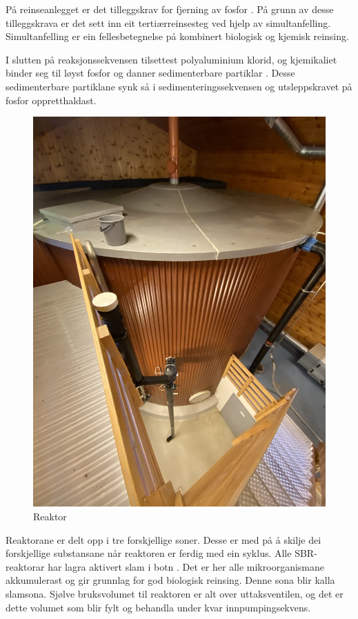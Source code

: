 På reinseanlegget er det tilleggskrav for fjerning av fosfor \citep{Regjeriga}. På grunn av desse tilleggskrava
er det sett inn eit tertiærreinsesteg ved hjelp av simultanfelling.
Simultanfelling er ein fellesbetegnelse på kombinert biologisk og kjemisk reinsing.

I slutten på reaksjonssekvensen tilsettest polyaluminium klorid, og kjemikaliet binder seg til
løyst fosfor og danner sedimenterbare partiklar \citep{Pax18}. Desse sedimenterbare partiklane synk 
så i sedimenteringssekvensen og utsleppskravet på fosfor oppretthaldast.

\begin{figure}[htbp]
    \centering
    \includegraphics[angle=-90, width=1\textwidth]{Bilder/BildeReaktor.jpg}
    \caption{Reaktor}\label{fig:reaktorsoner}
\end{figure}

\newpage

Reaktorane er delt opp i tre forskjellige soner. Desse er med på å skilje
dei forskjellige substansane når reaktoren er ferdig med ein syklus.
Alle \gls{SBR}-reaktorar har lagra aktivert slam i botn \citep{Statsforvalter}. Det er her alle mikroorganismane akkumulerast 
og gir grunnlag for god biologisk reinsing. Denne sona blir kalla slamsona.\newline
Sjølve bruksvolumet til reaktoren er alt over uttaksventilen, 
og det er dette volumet som blir fylt og behandla under kvar innpumpingsekvens.

